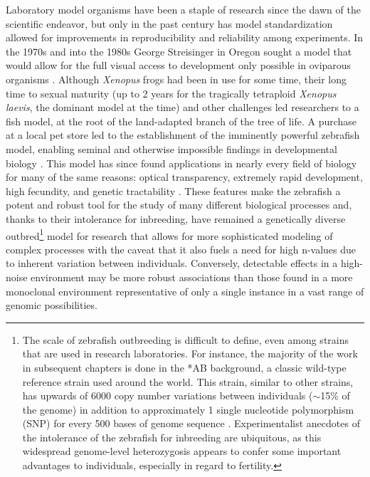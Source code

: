 Laboratory model organisms have been a staple of research since the dawn of the scientific endeavor, but only in the past century has model standardization allowed for improvements in reproducibility and reliability among experiments. In the 1970s and into the 1980s George Streisinger in Oregon sought a model that would allow for the full visual access to development only possible in oviparous organisms \citep{Streisinger1981}. Although \textit{Xenopus} frogs had been in use for some time, their long time to sexual maturity (up to 2 years for the tragically tetraploid \textit{Xenopus laevis}, the dominant model at the time) and other challenges led researchers to a fish model, at the root of the land\hyp{}adapted branch of the tree of life. A purchase at a local pet store led to the establishment of the imminently powerful zebrafish model, enabling seminal and otherwise impossible findings in developmental biology \citep{ZFIN2022}. This model has since found applications in nearly every field of biology for many of the same reasons: optical transparency, extremely rapid development, high fecundity, and genetic tractability \citep{Grunwald2002, Eisen2020}. These features make the zebrafish a potent and robust tool for the study of many different biological processes and, thanks to their intolerance for inbreeding, have remained a genetically diverse outbred\footnote{The scale of zebrafish outbreeding is difficult to define, even among strains that are used in research laboratories. For instance, the majority of the work in subsequent chapters is done in the *AB background, a classic wild\hyp{}type reference strain used around the world. This strain, similar to other strains, has upwards of 6000 copy number variations between individuals ($\sim$15\% of the genome) in addition to approximately 1 single nucleotide polymorphism (SNP) for every 500 bases of genome sequence \citep{Guryev2006, Brown2012, BalikMeisner2018}. Experimentalist anecdotes of the intolerance of the zebrafish for inbreeding are ubiquitous, as this widespread genome\hyp{}level heterozygosis appears to confer some important advantages to individuals, especially in regard to fertility.} model for research that allows for more sophisticated modeling of complex processes with the caveat that it also fuels a need for high n\hyp{}values due to inherent variation between individuals. Conversely, detectable effects in a high\hyp{}noise environment may be more robust associations than those found in a more monoclonal environment representative of only a single instance in a vast range of genomic possibilities.

